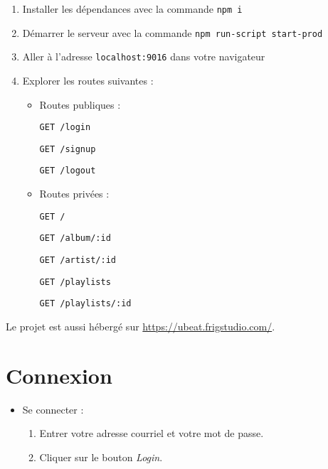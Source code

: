 \documentclass[12pt, letterpaper]{article}
\begin{document}
    \begin{enumerate}
        \item Installer les dépendances avec la commande \verb|npm i|
        \item Démarrer le serveur avec la commande \verb|npm run-script start-prod|
        \item Aller à l'adresse \verb|localhost:9016| dans votre navigateur
        \item Explorer les routes suivantes : \par
        \begin{itemize}
            \item Routes publiques : \par
            \verb|GET /login| \par
            \verb|GET /signup| \par
            \verb|GET /logout|
            
            \item Routes privées : \par
            \verb|GET /| \par
            \verb|GET /album/:id| \par
            \verb|GET /artist/:id| \par
            \verb|GET /playlists| \par
            \verb|GET /playlists/:id|
        \end{itemize}
    \end{enumerate}

    \bigskip

    Le projet est aussi hébergé sur \url{https://ubeat.frigstudio.com/}.
    
    \section*{Connexion}
    \begin{itemize}
        \item Se connecter :
        \begin{enumerate}
            \item Entrer votre adresse courriel et votre mot de passe.
            \item Cliquer sur le bouton \textit{Login}.
        \end{enumerate}
    \end{itemize}
    
\end{document}
